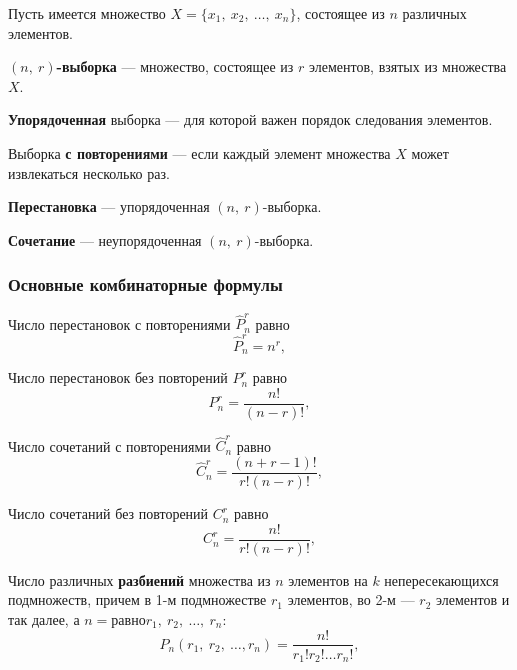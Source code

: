 \documentclass[a4paper]{article}
\newcommand{\rep}[1]{\widehat{#1}}
\newcommand{\key}[1]{{\bfseries\color{Medium} #1}}
\begin{document}
                Пусть имеется множество $X = \{ x_1 , \: x_2 , \: \ldots , \: x_n \}$, состоящее из $n$ различных элементов.

                \key{\boldmath$(n, \: r)$-выборка} --- множество, состоящее из $r$ элементов, взятых из множества $X$.

                \key{Упорядоченная} выборка --- для которой важен порядок следования элементов.

                Выборка \key{с повторениями} --- если каждый элемент множества $X$ может извлекаться несколько раз.

                \key{Перестановка} --- упорядоченная $(n, \: r)$-выборка.

                \key{Сочетание} --- неупорядоченная $(n, \: r)$-выборка.

            \subsubsection{Основные комбинаторные формулы}

                Число перестановок с повторениями $\rep{P}^r_n$ равно
                \begin{equation*}
                    \rep{P}^r_n = n^r ,
                \end{equation*}
                
                Число перестановок без повторений $P^r_n$ равно
                \begin{equation*}
                    P^r_n = \frac{n!}{(n - r)!} ,
                \end{equation*}

                Число сочетаний с повторениями $\rep{C}^r_n$ равно
                \begin{equation*}
                    \rep{C}^r_n = \frac{(n + r - 1)!}{r! (n - r)!} ,
                \end{equation*}

                Число сочетаний без повторений $C^r_n$ равно
                \begin{equation*}
                    C^r_n = \frac{n!}{r! (n - r)!} ,
                \end{equation*}

                Число различных \key{разбиений} множества из $n$ элементов на $k$ непересекающихся подмножеств, причем в 1-м подмножестве $r_1$ элементов, во 2-м --- $r_2$ элементов и так далее, а $n = равно r_1 , \: r_2 , \: \ldots , \: r_n $:
                \begin{equation*}
                    P_n(r_1 , \: r_2 , \: \ldots , r_n) = \frac{n!}{r_1! r_2! \ldots r_n!} ,
                \end{equation*}
\end{document}
